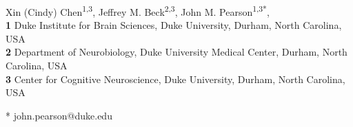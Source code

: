 \documentclass[10pt,letterpaper]{article}
\date{}
\begin{document}
\vspace*{0.35in}

\begin{flushleft}
{\Large
\textbf{} %
}
\newline
Xin (Cindy) Chen\textsuperscript{1,3},
Jeffrey M. Beck\textsuperscript{2,3},
John M. Pearson\textsuperscript{1,3*},
\\
\bigskip
\textbf{1} Duke Institute for Brain Sciences, Duke University, Durham, North Carolina, USA
\\
\textbf{2} Department of Neurobiology, Duke University Medical Center, Durham, North Carolina, USA
\\
\textbf{3} Center for Cognitive Neuroscience, Duke University, Durham, North Carolina, USA
\\
\bigskip

%
%



* john.pearson@duke.edu

\end{flushleft}
\end{document}
